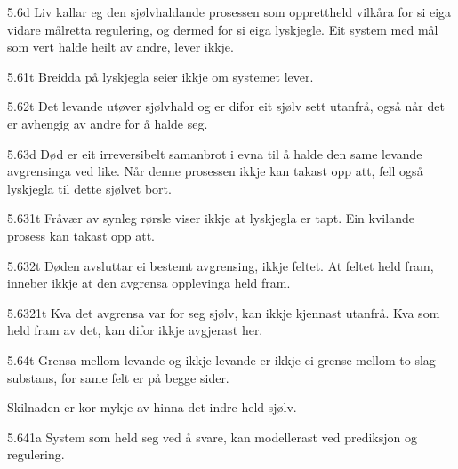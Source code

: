 \begin{formproposition}{5.6}{d}
Liv kallar eg den sjølvhaldande prosessen som opprettheld vilkåra for si eiga vidare målretta regulering, og dermed for si eiga lyskjegle. Eit system med mål som vert halde heilt av andre, lever ikkje.
\end{formproposition}

\begin{formproposition}{5.61}{t}
Breidda på lyskjegla seier ikkje om systemet lever.
\end{formproposition}

\begin{formproposition}{5.62}{t}
Det levande utøver sjølvhald og er difor eit sjølv sett utanfrå, også når det er avhengig av andre for å halde seg.
\end{formproposition}

\begin{formproposition}{5.63}{d}
Død er eit irreversibelt samanbrot i evna til å halde den same levande avgrensinga ved like. Når denne prosessen ikkje kan takast opp att, fell også lyskjegla til dette sjølvet bort.
\end{formproposition}

\begin{formproposition}{5.631}{t}
Fråvær av synleg rørsle viser ikkje at lyskjegla er tapt. Ein kvilande prosess kan takast opp att.
\end{formproposition}

\begin{formproposition}{5.632}{t}
Døden avsluttar ei bestemt avgrensing, ikkje feltet. At feltet held fram, inneber ikkje at den avgrensa opplevinga held fram.
\end{formproposition}

\begin{formproposition}{5.6321}{t}
Kva det avgrensa var for seg sjølv, kan ikkje kjennast utanfrå. Kva som held fram av det, kan difor ikkje avgjerast her.
\end{formproposition}

\begin{formproposition}{5.64}{t}
Grensa mellom levande og ikkje-levande er ikkje ei grense mellom to slag substans, for same felt er på begge sider.

Skilnaden er kor mykje av hinna det indre held sjølv.
\end{formproposition}

\begin{formproposition}{5.641}{a}
System som held seg ved å svare, kan modellerast ved prediksjon og regulering.
\end{formproposition}

